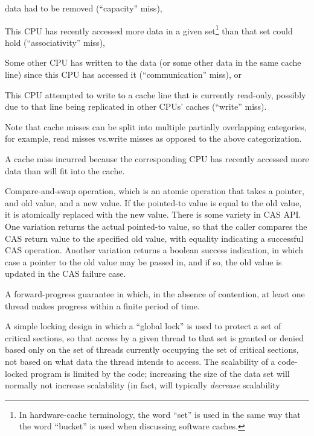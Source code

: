 \begin{description}
\begin{enumerate*}[(1)]
	data had to be removed (``capacity'' miss),
	\item This CPU
	has recently accessed more data in a given set\footnote{
		In hardware-cache terminology, the word ``set''
		is used in the same way that the word ``bucket''
		is used when discussing software caches.}
	than that set could hold (``associativity'' miss),
	\item Some other CPU has written to the data (or some other
	data in the same cache line) since this CPU has accessed it
	(``communication'' miss), or
	\item This CPU attempted to write to a cache line that is
	currently read-only, possibly due to that line being replicated
	in other CPUs' caches (``write'' miss).
	\end{enumerate*}
	Note that cache misses can be split into multiple partially
	overlapping categories, for example, read misses vs.\@ write misses
	as opposed to the above categorization.
\item[\IXGalth{Capacity Miss}{capacity}{cache miss}:]
	A cache miss incurred because the corresponding CPU has recently
	accessed more data than will fit into the cache.
\item[CAS:]
	Compare-and-swap operation, which is an atomic operation that
	takes a pointer, and old value, and a new value.
	If the pointed-to value is equal to the old value, it is atomically
	replaced with the new value.
	There is some variety in CAS API\@.
	One variation returns the actual pointed-to value, so that the
	caller compares the CAS return value to the specified old value,
	with equality indicating a successful CAS operation.
	Another variation returns a boolean success indication, in which
	case a pointer to the old value may be passed in, and if so,
	the old value is updated in the CAS failure case.
\item[\IXG{Clash Free}:]
	A forward-progress guarantee in which, in the absence of
	contention, at least one thread makes progress within a finite
	period of time.
\item[\IXGalth{Code Locking}{code}{locking}:]
	A simple locking design in which a ``global lock'' is used to protect
	a set of critical sections, so that access by a given thread
	to that set is
	granted or denied based only on the set of threads currently
	occupying the set of critical sections, not based on what
	data the thread intends to access.
	The scalability of a code-locked program is limited by the code;
	increasing the size of the data set will normally not increase
	scalability (in fact, will typically \emph{decrease} scalability

\end{description}
